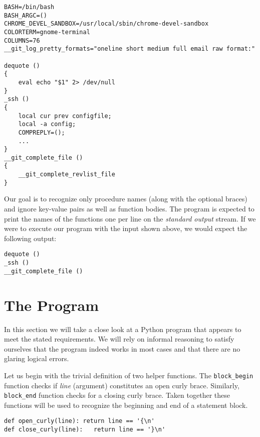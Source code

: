 \documentclass[10pt, a4paper]{article}
\begin{document}
{
\begin{lstlisting}
BASH=/bin/bash
BASH_ARGC=()
CHROME_DEVEL_SANDBOX=/usr/local/sbin/chrome-devel-sandbox
COLORTERM=gnome-terminal
COLUMNS=76
__git_log_pretty_formats="oneline short medium full email raw format:"

dequote ()
{
    eval echo "$1" 2> /dev/null
}
_ssh ()
{
    local cur prev configfile;
    local -a config;
    COMPREPLY=();
    ...
}
__git_complete_file ()
{
    __git_complete_revlist_file
}
\end{lstlisting}}

Our goal is to recognize only procedure names (along with the optional braces) and ignore key-value pairs as well as function bodies. The program is expected to print the names of the functions one per line on the \emph{standard output} stream. If we were to execute our program with the input shown above, we would expect the following output:

{
\begin{lstlisting}
dequote ()
_ssh ()
__git_complete_file ()
\end{lstlisting}}

\section{The Program}
In this section we will take a close look at a Python program that appears to meet the stated requirements. We will rely on informal reasoning to satisfy ourselves that the program indeed works in most cases and that there are no glaring logical errors.

Let us begin with the trivial definition of two helper functions. The \texttt{block\_begin} function checks if \emph{line} (argument) constitutes an open curly brace. Similarly, \texttt{block\_end} function checks for a closing curly brace. Taken together these functions will be used to recognize the beginning and end of a statement block.

\noindent\begin{lstlisting}
def open_curly(line): return line == '{\n'
def close_curly(line):   return line == '}\n'
\end{lstlisting}
\end{document}

